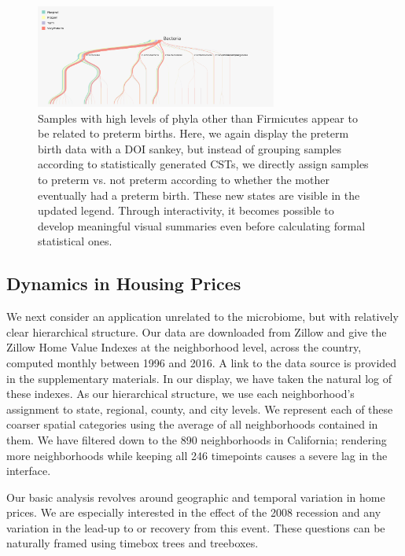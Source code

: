 \documentclass[12pt]{article}
\begin{document}
\begin{figure}
\centering
\includegraphics[width=300px]{figure/preterm_preterm}
\caption{Samples with high levels of phyla other than Firmicutes appear to be
  related to preterm births. Here, we again display the preterm birth data with
  a DOI sankey, but instead of grouping samples according to statistically
  generated CSTs, we directly assign samples to preterm vs. not preterm
  according to whether the mother eventually had a preterm birth. These new
  states are visible in the updated legend. Through interactivity, it becomes
  possible to develop meaningful visual summaries even before calculating formal
  statistical ones.}
\label{fig:pretermpreterm}
\end{figure}

\subsection{Dynamics in Housing Prices}\label{zillow-study}

We next consider an application unrelated to the microbiome, but with relatively
clear hierarchical structure. Our data are downloaded from Zillow and give the
Zillow Home Value Indexes at the neighborhood level, across the country,
computed monthly between 1996 and 2016. A link to the data source is provided in
the supplementary materials. In our display, we have taken the natural log of
these indexes. As our hierarchical structure, we use each neighborhood's
assignment to state, regional, county, and city levels. We represent each of
these coarser spatial categories using the average of all neighborhoods
contained in them. We have filtered down to the 890 neighborhoods in California;
rendering more neighborhoods while keeping all 246 timepoints causes a severe
lag in the interface.

Our basic analysis revolves around geographic and temporal variation in home
prices. We are especially interested in the effect of the 2008 recession and any
variation in the lead-up to or recovery from this event. These questions can be
naturally framed using timebox trees and treeboxes.
\end{document}
